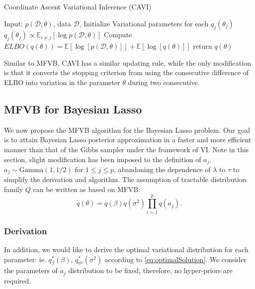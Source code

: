 \begin{algorithm}
	\caption{Coordinate Ascent Variational Inference (CAVI)}
	\begin{algorithmic}[1]
		
		\State Input: $p(\mathcal{D},\theta)$, data $\mathcal{D}$, Initialize Variational parameters for each $q_j(\theta_j)$
		\State $q_j(\theta_j) \propto \mathbb{E}_{i\neq j}[\log p(\mathcal{D},\theta)]$
		\EndFor
		\State Compute $ELBO(q(\theta)) = \mathbb{E}[\log[p(\mathcal{D},\theta)]] + \mathbb{E}[\log[q(\theta)]]$
		\EndWhile 
		\State return $q(\theta)$
		
		
		
	\end{algorithmic}
\end{algorithm}
Similar to MFVB, CAVI has a similar updating rule, while the only modification is that it converts the stopping criterion from using the consecutive difference of ELBO into variation in the parameter $\theta$ during two consecutive.

\subsection{MFVB for Bayesian Lasso}
We now propose the MFVB algorithm for the Bayesian Lasso problem. Our goal is to attain Bayesian Lasso posterior approximation in a faster and more efficient manner than that of the Gibbs sampler under the framework of VI. Note in this section, slight modification has been imposed to the definition of $a_j$. $a_j \sim \text{Gamma}(1,1/2)\text{ for }1\leq j \leq p$, abandoning the dependence of $\lambda$ to $\tau$ to simplify the derivation and algorithm. The assumption of tractable distribution family $Q$ can be written as based on MFVB:
\begin{equation}
	q(\theta) = q(\beta)q(\sigma^2)\prod_{i=1}^p q(a_j).
\end{equation}

\subsubsection{Derivation}
In addition, we would like to derive the optimal variational distribution for each parameter: ie. $q_{\beta}^*(\beta)$, $q_{\sigma^2}^*(\sigma^2)$ according to \autoref{eq:optimalSolution}. We consider the parameters of $a_j$ distribution to be fixed, therefore, no hyper-priors are required.


